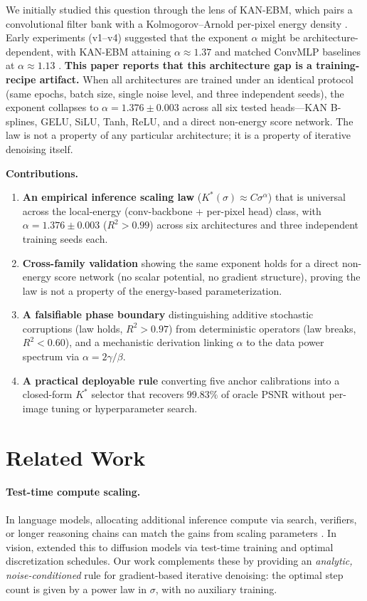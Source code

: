 \documentclass[letterpaper]{article}
\begin{document}
We initially studied this question through the lens of KAN-EBM, which pairs a convolutional filter bank with a Kolmogorov--Arnold per-pixel energy density \citep{liu2024kan}. Early experiments (v1--v4) suggested that the exponent $\alpha$ might be architecture-dependent, with KAN-EBM attaining $\alpha \approx 1.37$ and matched ConvMLP baselines at $\alpha \approx 1.13$ \citep{khatib2026kan}. \textbf{This paper reports that this architecture gap is a training-recipe artifact.} When all architectures are trained under an identical protocol (same epochs, batch size, single noise level, and three independent seeds), the exponent collapses to $\alpha = 1.376 \pm 0.003$ across all six tested heads---KAN B-splines, GELU, SiLU, Tanh, ReLU, and a direct non-energy score network. The law is not a property of any particular architecture; it is a property of iterative denoising itself.

\textbf{Contributions.}
\begin{enumerate}[leftmargin=*,topsep=2pt,itemsep=1pt,parsep=0pt]
\item \textbf{An empirical inference scaling law} ($K^{*}(\sigma) \approx C\sigma^{\alpha}$) that is universal across the local-energy (conv-backbone + per-pixel head) class, with $\alpha = 1.376 \pm 0.003$ ($R^2 > 0.99$) across six architectures and three independent training seeds each.
\item \textbf{Cross-family validation} showing the same exponent holds for a direct non-energy score network (no scalar potential, no gradient structure), proving the law is not a property of the energy-based parameterization.
\item \textbf{A falsifiable phase boundary} distinguishing additive stochastic corruptions (law holds, $R^2 > 0.97$) from deterministic operators (law breaks, $R^2 < 0.60$), and a mechanistic derivation linking $\alpha$ to the data power spectrum via $\alpha = 2\gamma/\beta$.
\item \textbf{A practical deployable rule} converting five anchor calibrations into a closed-form $K^*$ selector that recovers $99.83\%$ of oracle PSNR without per-image tuning or hyperparameter search.
\end{enumerate}

\section{Related Work}
\label{sec:related}

\paragraph{Test-time compute scaling.} In language models, allocating additional inference compute via search, verifiers, or longer reasoning chains can match the gains from scaling parameters \citep{snell2024llm, brown2024llm_scaling}. In vision, \citet{wu2025inference, wu2024inference} extended this to diffusion models via test-time training and optimal discretization schedules. Our work complements these by providing an \emph{analytic, noise-conditioned} rule for gradient-based iterative denoising: the optimal step count is given by a power law in $\sigma$, with no auxiliary training.
\end{document}
